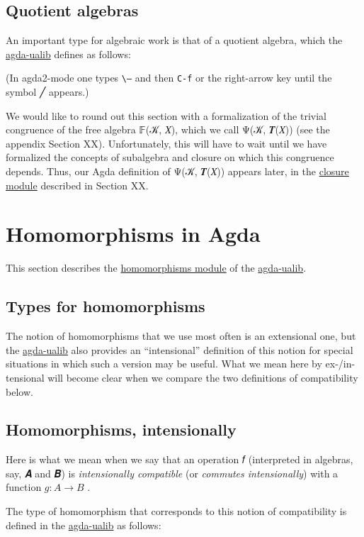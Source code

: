 \documentclass[sigplan,screen]{acmart}
\newcommand\homomorphismsmodule{\href{https://gitlab.com/ualib/ualib.gitlab.io/-/blob/master/homomorphisms.lagda.rst}{homomorphisms module}\xspace}
\newcommand\closuremodule{\href{https://gitlab.com/ualib/ualib.gitlab.io/-/blob/master/congruences.lagda.rst}{closure module}\xspace}
\newcommand{\agdaualib}{\href{https://ualib.org}{agda-ualib}\xspace}
\newcommand{\agdaualib}{\href{anonymizedLink/agda-ualib.html}{agda-ualib}\xspace}
\newcommand\homomorphismsmodule{\href{anonymizedLink/homomorphisms.lagda.rst}{homomorphisms module}\xspace}
\newcommand\closuremodule{\href{anonymizedLink/congruences.lagda.rst}{closure module}\xspace}
\begin{document}
\subsection{Quotient algebras}
An important type for algebraic work is that of a quotient algebra, which the \agdaualib defines as follows:
\begin{code}\end{code}

\noindent (In agda2-mode one types \texttt{\textbackslash ---} and then \texttt{C-f} or the right-arrow key until the symbol ╱ appears.)

We would like to round out this section with a formalization of the trivial congruence of the free algebra 𝔽(𝒦, 𝑋), which we call Ψ(𝒦, 𝑻(𝑋)) (see the appendix Section XX). Unfortunately, this will have to wait until we have formalized the concepts of subalgebra and closure on which this congruence depends. Thus, our Agda definition of Ψ(𝒦, 𝑻(𝑋)) appears later, in the \closuremodule described in Section XX.

\section{Homomorphisms in Agda}\label{homomorphisms-in-agda}
This section describes the \homomorphismsmodule of the \agdaualib.

\subsection{Types for homomorphisms}\label{types-for-homomorphisms}
The notion of homomorphisms that we use most often is an extensional one, but the \agdaualib also provides an ``intensional'' definition of this notion for special situations in which such a version may be useful. What we mean here by ex-/in-tensional will become clear when we compare the two definitions of compatibility below.

\subsection{Homomorphisms, intensionally}
Here is what we mean when we say that an operation 𝑓 (interpreted in algebras, say, 𝑨 and 𝑩) is \emph{intensionally compatible} (or \emph{commutes intensionally}) with a function \(g : A → B\) .
\begin{code}\end{code}
The type of homomorphism that corresponds to this notion of compatibility is defined in the \agdaualib as follows:
\begin{code}\end{code}
\end{document}
